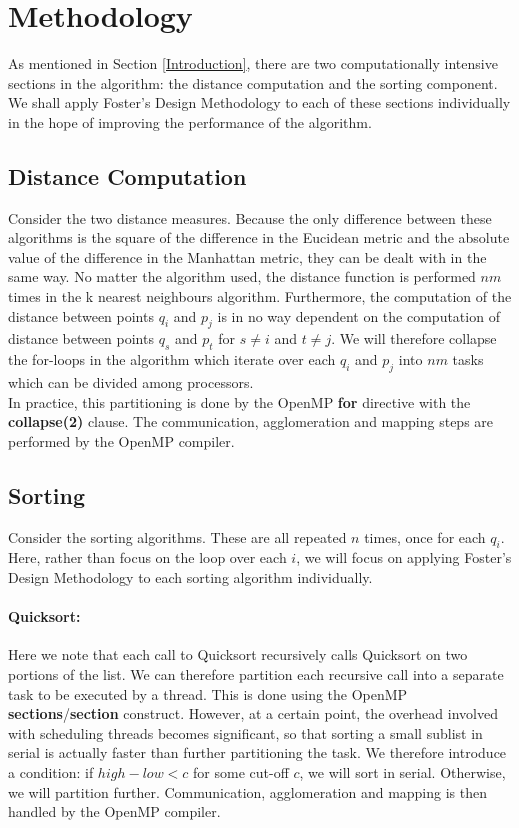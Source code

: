 \documentclass[10pt]{article}
\begin{document}
\section{Methodology}\label{Methodology}
As mentioned in Section \ref{Introduction}, there are two computationally intensive sections in the algorithm: the distance computation and the sorting component. We shall apply Foster's Design Methodology to each of these sections individually in the hope of improving the performance of the algorithm.
\subsection{Distance Computation}
Consider the two distance measures. Because the only difference between these algorithms is the square of the difference in the Eucidean metric and the absolute value of the difference in the Manhattan metric, they can be dealt with in the same way. No matter the algorithm used, the distance function is performed $nm$ times in the k nearest neighbours algorithm. Furthermore, the computation of the distance between points $q_{i}$ and $p_{j}$ is in no way dependent on the computation of distance between points $q_{s}$ and $p_{t}$ for $s\neq i$ and $t\neq j$. We will therefore collapse the for-loops in the algorithm which iterate over each  $q_{i}$ and $p_{j}$ into $nm$ tasks which can be divided among processors. 
\\
In practice, this partitioning is done by the OpenMP \textbf{for} directive with the \textbf{collapse(2)} clause. The communication, agglomeration and mapping steps are performed by the OpenMP compiler.
\subsection{Sorting}
Consider the sorting algorithms. These are all repeated $n$ times, once for each $q_{i}$. Here, rather than focus on the loop over each $i$, we will focus on applying Foster's Design Methodology to each sorting algorithm individually.
\paragraph{Quicksort:}
Here we note that each call to Quicksort recursively calls Quicksort on two portions of the list. We can therefore partition each recursive call into a separate task to be executed by a thread. This is done using the OpenMP \textbf{sections}/\textbf{section} construct. However, at a certain point, the overhead involved with scheduling threads becomes significant, so that sorting a small sublist in serial is actually faster than further partitioning the task. We therefore introduce a condition: if $high-low<c$ for some cut-off $c$, we will sort in serial. Otherwise, we will partition further. Communication, agglomeration and mapping is then handled by the OpenMP compiler.
\end{document}

